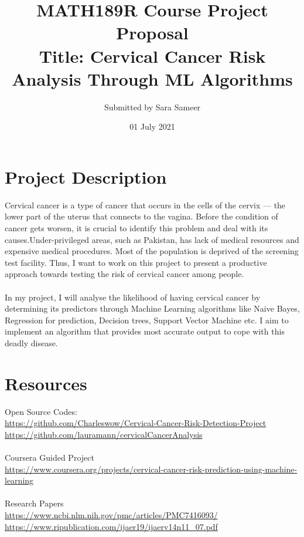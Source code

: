 \documentclass{article}
\title {MATH189R Course Project Proposal \\
\large Title: Cervical Cancer Risk Analysis Through ML Algorithms  }
\author{Submitted by Sara Sameer }
\date{ 01 July 2021}
\begin{document}
\maketitle

\section*{Project Description}
\smallskip
Cervical cancer is a type of cancer that occurs in the cells of the cervix — the lower part of the uterus that connects to the vagina. Before the condition of cancer gets worsen, it is crucial to identify this problem and deal with its causes.Under-privileged areas, such as Pakistan, has lack of medical resources and expensive medical procedures. Most of the population is deprived of the screening test facility. Thus, I want to work on this project to present a productive approach towards testing the risk of cervical cancer among people.\\\\
\smallskip
In my project, I will analyse the likelihood of having cervical cancer by determining its predictors through Machine Learning algorithms like Naive Bayes, Regression for prediction, Decision trees, Support Vector Machine etc. I aim to implement an algorithm that provides most accurate output to cope with this deadly disease.

\section*{Resources}

\large Open Source Codes:\\
\url{https://github.com/Charleswow/Cervical-Cancer-Risk-Detection-Project}
\url{https://github.com/lauramann/cervicalCancerAnalysis}\\\\
\smallskip
\large Coursera Guided Project\\
\url{https://www.coursera.org/projects/cervical-cancer-risk-prediction-using-machine-learning}\\\\
\smallskip
\large Research Papers \\
\url{https://www.ncbi.nlm.nih.gov/pmc/articles/PMC7416093/} \\
\url{https://www.ripublication.com/ijaer19/ijaerv14n11_07.pdf}\\
\end{document}
